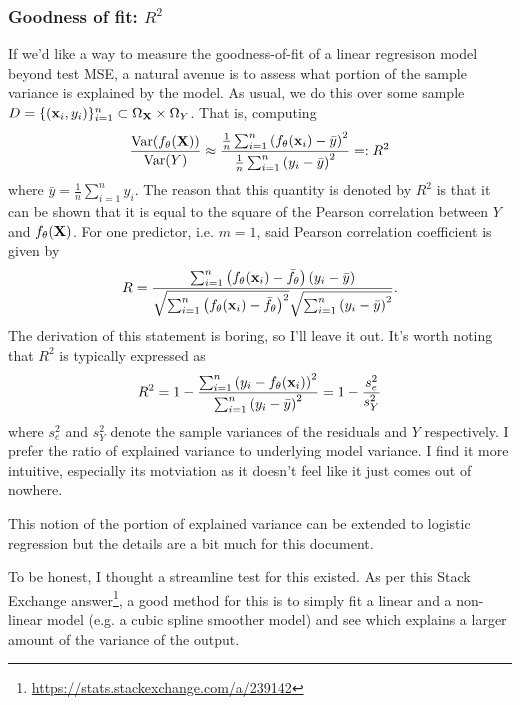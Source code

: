 \documentclass[11pt]{article}
\begin{document}
\subsubsection{Goodness of fit: $R^2$}
If we'd like a way to measure the goodness-of-fit of a linear regresison model beyond test MSE, a natural avenue is to assess what portion of the sample variance is explained by the model. As usual, we do this over some sample $D=\{(\mathbf{x}_i,y_i)\}_{i=1}^n\subset\Omega_{\mathbf{X}}\times\Omega_{Y}$. That is, computing
$$
\frac{\text{Var}(f_{\theta}(\mathbf{X}))}{\text{Var}(Y)}
\approx
\frac{\frac{1}{n}\sum_{i=1}^n\left(f_{\theta}(\mathbf{x}_i)-\bar{y}\right)^2}{\frac{1}{n}\sum_{i=1}^n\left(y_i-\bar{y}\right)^2}
=:
R^2
$$
where $\bar{y}=\frac{1}{n}\sum_{i=1}^ny_i$. The reason that this quantity is denoted by $R^2$ is that it can be shown that it is equal to the square of the Pearson correlation between $Y$ and $f_{\theta}(\mathbf{X})$. For one predictor, i.e. $m=1$, said Pearson correlation coefficient is given by
$$
R
=
\frac{\sum_{i=1}^n\left(f_{\theta}(\mathbf{x}_i)-\bar{f}_{\theta}\right)(y_i-\bar{y})}{\sqrt{\sum_{i=1}^n\left(f_{\theta}(\mathbf{x}_i)-\bar{f}_{\theta}\right)^2}\sqrt{\sum_{i=1}^n\left(y_i-\bar{y}\right)^2}}.
$$
The derivation of this statement is boring, so I'll leave it out. It's worth noting that $R^2$ is typically expressed as
$$
R^2
=
1-\frac{\sum_{i=1}^n\left(y_i-f_{\theta}(\mathbf{x}_i)\right)^2}{\sum_{i=1}^n\left(y_i-\bar{y}\right)^2}
=
1-\frac{s_e^2}{s_Y^2}
$$
where $s_e^2$ and $s_Y^2$ denote the sample variances of the residuals and $Y$ respectively. I prefer the ratio of explained variance to underlying model variance. I find it more intuitive, especially its motviation as it doesn't feel like it just comes out of nowhere.

This notion of the portion of explained variance can be extended to logistic regression but the details are a bit much for this document.

\begin{tcolorbox}[title={\centering\textbf{How can we get an idea of the extent to which our features and output are linearly related without plotting?}}, colback=myLightBlue, colbacktitle=myDarkBlue, colframe=myDarkBlue, coltitle=white]
    To be honest, I thought a streamline test for this existed. As per this Stack Exchange answer\footnote{\url{https://stats.stackexchange.com/a/239142}}, a good method for this is to simply fit a linear and a non-linear model (e.g. a cubic spline smoother model) and see which explains a larger amount of the variance of the output.
\end{tcolorbox}
\end{document}
